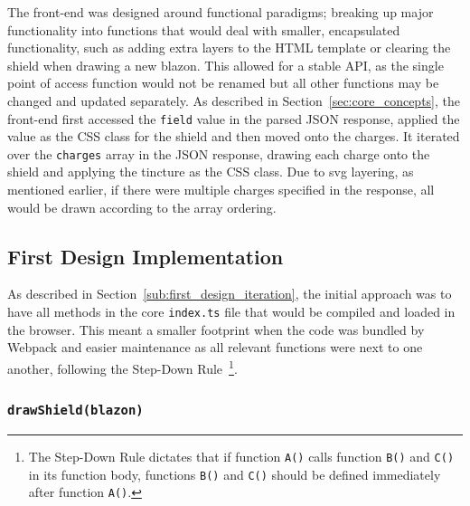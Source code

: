 \documentclass[nobib, a4paper, twoside, justified]{tufte-book}
\makeatletter
\newcommand{\svg}{\gls{svg}\@\xspace}
\newcommand{\charge}{\gls{charge}\@\xspace}
\newcommand{\charges}{\glspl{charge}\@\xspace}
\newcommand{\blazon}{\gls{blazon}\@\xspace}
\makeatother
\begin{document}
The front-end was designed around functional paradigms; breaking up major functionality into
functions that would deal with smaller, encapsulated functionality, such as adding extra layers to
the HTML template or clearing the shield when drawing a new \blazon. This allowed for a stable API,
as the single point of access function would not be renamed but all other functions may be changed
and updated separately. As described in Section~\ref{sec:core_concepts}, the front-end first
accessed the \texttt{field} value in the parsed JSON response, applied the value as the CSS class
for the shield and then moved onto the \charges. It iterated over the \texttt{\charges} array in
the JSON response, drawing each \charge onto the shield and applying the tincture as the CSS class.
Due to \svg layering, as mentioned earlier, if there were multiple \charges specified in the
response, all would be drawn according to the array ordering.

\subsection{First Design Implementation}%
\label{sub:first_design_implementation}

As described in Section~\ref{sub:first_design_iteration}, the initial approach was to have all methods in
the core \texttt{index.ts} file that would be compiled and loaded in the browser. This
meant a smaller footprint when the code was bundled by Webpack and easier maintenance as all
relevant functions were next to one another, following the Step-Down
Rule~\autocite{martin2009clean}\footnote{The Step-Down Rule dictates that if function \texttt{A()}
calls function \texttt{B()} and \texttt{C()} in its function body, functions \texttt{B()} and
\texttt{C()} should be defined immediately after function \texttt{A()}.}.

\subsubsection{\texttt{drawShield(\blazon)}}%
\label{ssub:draw_shield}
\end{document}
